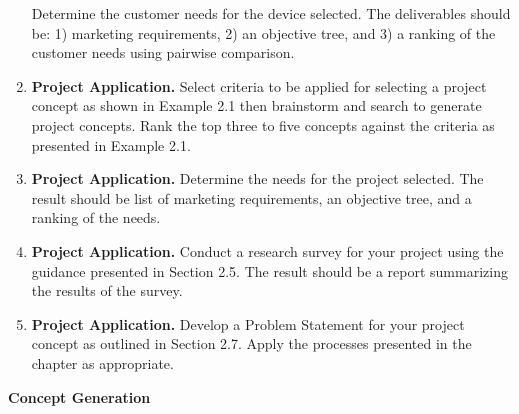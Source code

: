 \begin{enumerate}
  Determine the customer needs for the device selected. The deliverables
  should be: 1) marketing requirements, 2) an objective tree, and 3) a
  ranking of the customer needs using pairwise comparison.
\item
  \textbf{Project Application.} Select criteria to be applied for
  selecting a project concept as shown in Example 2.1 then brainstorm
  and search to generate project concepts. Rank the top three to five
  concepts against the criteria as presented in Example 2.1.
\item
  \textbf{Project Application.} Determine the needs for the project
  selected. The result should be list of marketing requirements, an
  objective tree, and a ranking of the needs.
\item
  \textbf{Project Application.} Conduct a research survey for your
  project using the guidance presented in Section 2.5. The result should
  be a report summarizing the results of the survey.
\item
  \textbf{Project Application.} Develop a Problem Statement for your
  project concept as outlined in Section 2.7. Apply the processes
  presented in the chapter as appropriate.
\end{enumerate}

\textbf{Concept Generation}
